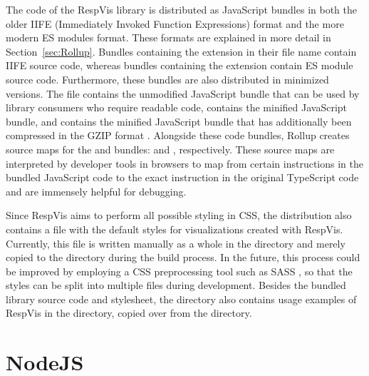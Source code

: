 The code of the RespVis library is distributed as JavaScript bundles
in both the older IIFE (Immediately Invoked Function Expressions)
format and the more modern ES modules format. These formats are
explained in more detail in Section~\ref{sec:Rollup}. Bundles
containing the  extension in their file name contain IIFE
source code, whereas bundles containing the  extension
contain ES module source code. Furthermore, these bundles are also
distributed in minimized versions. The  file
contains the unmodified JavaScript bundle that can be used by library
consumers who require readable code, 
contains the minified JavaScript bundle, and
 contains the minified JavaScript
bundle that has additionally been compressed in the GZIP format
\parencite{GZIP}. Alongside these code bundles, Rollup creates source
maps for the  and
 bundles: 
and , respectively. These source maps
are interpreted by developer tools in browsers to map from certain
instructions in the bundled JavaScript code to the exact instruction
in the original TypeScript code and are immensely helpful for
debugging.


Since RespVis aims to perform all possible styling in CSS, the
distribution also contains a  file with the
default styles for visualizations created with RespVis. Currently,
this file is written manually as a whole in the  directory
and merely copied to the  directory during the build
process. In the future, this process could be improved by employing a
CSS preprocessing tool such as SASS \parencite{SASS}, so that the
styles can be split into multiple files during development. Besides
the bundled library source code and stylesheet, the 
directory also contains usage examples of RespVis in the
 directory, copied over from the
 directory.






\section{NodeJS}

